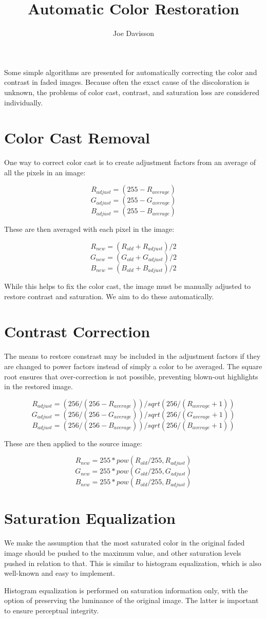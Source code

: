 \documentclass{article}
\title{Automatic Color Restoration}
\author{Joe Davisson} %
\begin{document}
\maketitle

Some simple algorithms are presented for automatically correcting the
color and contrast in faded images.  Because often the exact cause of the
discoloration is unknown, the problems of color cast, contrast, and
saturation loss are considered individually.

\section{Color Cast Removal}

One way to correct color cast is to create adjustment factors from an
average of all the pixels in an image:

\[ R_{adjust} = (255 - R_{average}) \]
\[ G_{adjust} = (255 - G_{average}) \]
\[ B_{adjust} = (255 - B_{average}) \]

These are then averaged with each pixel in the image:

\[ R_{new} = (R_{old} + R_{adjust}) / 2 \]
\[ G_{new} = (G_{old} + G_{adjust}) / 2 \]
\[ B_{new} = (B_{old} + B_{adjust}) / 2 \]

While this helps to fix the color cast, the image must be manually adjusted
to restore contrast and saturation. We aim to do these automatically.

\section{Contrast Correction}

The means to restore constrast may be included in the adjustment factors if
they are changed to power factors instead of simply a color to be averaged.
The square root ensures that over-correction is not possible, preventing
blown-out highlights in the restored image.

\[ R_{adjust} = (256 / (256 - R_{average})) / sqrt(256 / (R_{average} + 1)) \]
\[ G_{adjust} = (256 / (256 - G_{average})) / sqrt(256 / (G_{average} + 1)) \]
\[ B_{adjust} = (256 / (256 - B_{average})) / sqrt(256 / (B_{average} + 1)) \]

These are then applied to the source image:

\[ R_{new} = 255 * pow(R_{old} / 255, R_{adjust}) \]
\[ G_{new} = 255 * pow(G_{old} / 255, G_{adjust}) \]
\[ B_{new} = 255 * pow(B_{old} / 255, B_{adjust}) \]

\section{Saturation Equalization}

We make the assumption that the most saturated color in the original faded
image should be pushed to the maximum value, and other saturation levels pushed in relation to that. This is similar to histogram equalization, which is also
well-known and easy to implement.

Histogram equalization is performed on saturation information only, with the option of preserving the luminance of the original image. The latter is important to ensure perceptual integrity.
\end{document}
